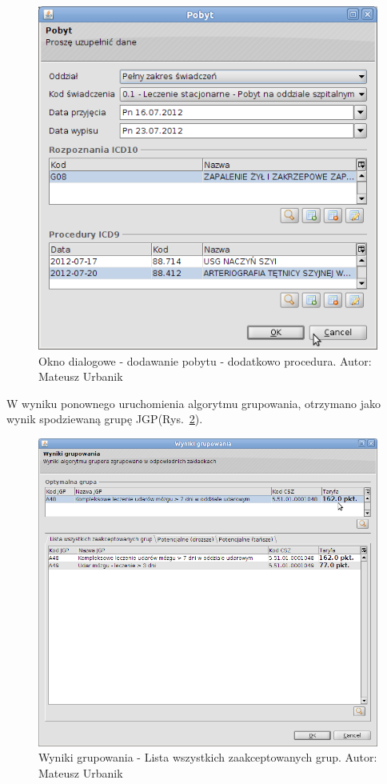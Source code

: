 \begin{figure}[!ht]
\centering
\includegraphics[scale=0.4]{images/gruper14}
\caption[Widok grupera]{Okno dialogowe - dodawanie pobytu - dodatkowo procedura. Autor: Mateusz Urbanik}
\label{img:gruper14}
\end{figure}

W wyniku ponownego uruchomienia algorytmu grupowania, otrzymano jako wynik spodziewaną grupę JGP(Rys.~\ref{img:gruper15}).

\begin{figure}%
\centering
\includegraphics[scale=0.4]{images/gruper15}
\caption[Widok grupera]{Wyniki grupowania - Lista wszystkich zaakceptowanych grup. Autor: Mateusz Urbanik}
\label{img:gruper15}
\end{figure}

